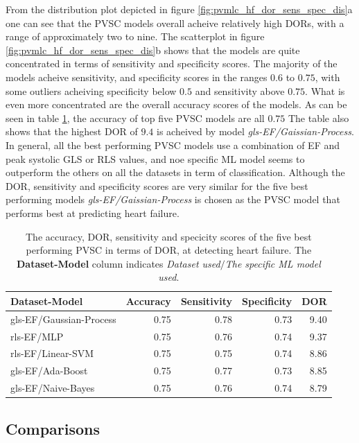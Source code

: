 From the distribution plot depicted in figure \ref{fig:pvmlc_hf_dor_sens_spec_dis}a one can see that the PVSC models overall acheive relatively high DORs, with a range of approximately two to nine.
The scatterplot in figure \ref{fig:pvmlc_hf_dor_sens_spec_dis}b shows that the models are quite concentrated in terms of sensitivity and specificity scores. 
The majority of the models acheive sensitivity, and specificity scores in the ranges $0.6$ to $0.75$, with some outliers acheiving specificity below $0.5$ and sensitivity above $0.75$.
What is even more concentrated are the overall accuracy scores of the models. 
As can be seen in table \ref{tab:pvmlc_hf_dor_sens_spec_dis}, the accuracy of top five PVSC models are all $0.75$
The table also shows that the highest DOR of $9.4$ is acheived by model \textit{gls-EF/Gaissian-Process}. 
In general, all the best performing PVSC models use a combination of EF and peak systolic GLS or RLS values, 
and noe specific ML model seems to outperform the others on all the datasets in term of classification.
Although the DOR, sensitivity and specificity scores are very similar for the five best performing models \textit{gls-EF/Gaissian-Process} 
is chosen as the PVSC model that performs best at predicting heart failure.

\begin{table}
    \centering
    \begin{tabular}{lrrrr}
        \toprule
        Dataset-Model           &  Accuracy &  Sensitivity &  Specificity &  DOR \\
        \midrule
        gls-EF/Gaussian-Process &      0.75 &         0.78 &         0.73 & 9.40 \\
        rls-EF/MLP              &      0.75 &         0.76 &         0.74 & 9.37 \\
        rls-EF/Linear-SVM       &      0.75 &         0.75 &         0.74 & 8.86 \\
        gls-EF/Ada-Boost        &      0.75 &         0.77 &         0.73 & 8.85 \\
        gls-EF/Naive-Bayes      &      0.75 &         0.76 &         0.74 & 8.79 \\
        \bottomrule
    \end{tabular}
    \caption{The accuracy, DOR, sensitivity and specicity scores of the five best performing PVSC in terms of DOR, at detecting heart failure.
             The \textbf{Dataset-Model} column indicates \textit{Dataset used}$/$\textit{The specific ML model used}.}
    \label{tab:pvmlc_hf_dor_sens_spec_dis}
\end{table}

\subsection{Comparisons}

\newpage

